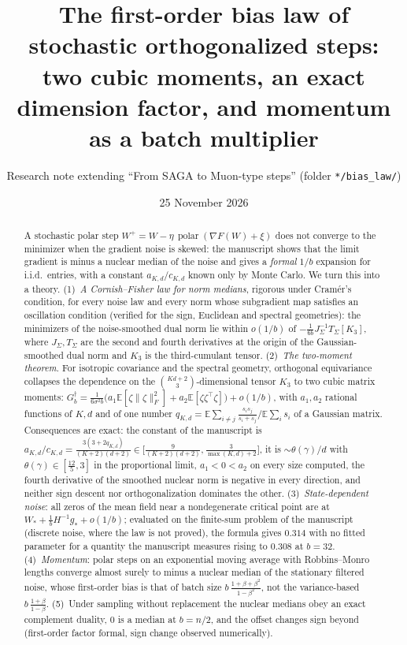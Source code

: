 \documentclass[10pt]{article}
\title{\vspace{-2em}The first-order bias law of stochastic orthogonalized steps:\\
two cubic moments, an exact dimension factor, and momentum as a batch multiplier}
\author{Research note extending ``From SAGA to Muon-type steps'' (folder \texttt{*/bias\_law/})}
\date{25 November 2026}
\theoremstyle{definition}
\theoremstyle{remark}
\newcommand{\E}{\mathbb{E}}
\newcommand{\nF}[1]{\|#1\|_{F}}
\newcommand{\polar}{\operatorname{polar}}
\newcommand{\st}{\dagger}
\begin{document}
\maketitle

\begin{abstract}
A stochastic polar step $W^+=W-\eta\,\polar(\nabla F(W)+\xi)$ does not converge to the minimizer when the gradient
noise is skewed: the manuscript shows that the limit gradient is minus a nuclear median of the noise and gives a
\emph{formal} $1/b$ expansion for i.i.d.\ entries, with a constant $a_{K,d}/c_{K,d}$ known only by Monte Carlo. We
turn this into a theory. (1)~\emph{A Cornish--Fisher law for norm medians}, rigorous under Cram\'er's condition, for
every noise law and every norm whose subgradient map satisfies an oscillation condition (verified for the sign,
Euclidean and spectral geometries): the minimizers of the noise-smoothed dual norm lie within $o(1/b)$ of
$-\frac1{6b}J_\Sigma^{-1}T_\Sigma[K_3]$, where $J_\Sigma,T_\Sigma$ are the second and fourth derivatives at the origin
of the Gaussian-smoothed dual norm and $K_3$ is the third-cumulant tensor. (2)~\emph{The two-moment theorem.} For
isotropic covariance and the spectral geometry, orthogonal equivariance collapses the dependence on the
$\binom{Kd+2}3$-dimensional tensor $K_3$ to two cubic matrix moments:
$G^\st_b=\frac1{6\sigma^2b}\big(a_1\E[\zeta\nF\zeta^2]+a_2\E[\zeta\zeta^\top\zeta]\big)+o(1/b)$, with $a_1,a_2$
rational functions of $K,d$ and of one number $q_{K,d}=\E\sum_{i\ne j}\frac{s_is_j}{s_i+s_j}/\E\sum_is_i$ of a Gaussian
matrix. Consequences are exact: the constant of the manuscript is
$a_{K,d}/c_{K,d}=\frac{3(3+2q_{K,d})}{(K+2)(d+2)}\in\big[\frac{9}{(K+2)(d+2)},\frac3{\max(K,d)+2}\big]$, it is
$\sim\theta(\gamma)/d$ with $\theta(\gamma)\in[\frac{12}5,3]$ in the proportional limit, $a_1<0<a_2$ on every size
computed, the fourth derivative of the smoothed nuclear norm is negative in every direction, and neither sign descent
nor orthogonalization dominates the other. (3)~\emph{State-dependent noise}: all zeros of the mean field near a
nondegenerate critical point are at $W_\ast+\frac1bH^{-1}g_\ast+o(1/b)$; evaluated on the finite-sum
problem of the manuscript (discrete noise, where the law is not proved), the formula gives $0.314$ with no fitted
parameter for a quantity the manuscript measures rising to $0.308$ at $b=32$. (4)~\emph{Momentum}: polar steps on an
exponential moving average with Robbins--Monro lengths converge almost surely to minus a nuclear median of the
stationary filtered noise, whose first-order bias is that of batch size $b\,\frac{1+\beta+\beta^2}{1-\beta^2}$, not the
variance-based $b\,\frac{1+\beta}{1-\beta}$. (5)~Under sampling without replacement the nuclear medians obey an exact
complement duality, $0$ is a median at $b=n/2$, and the offset changes sign beyond (first-order factor formal, sign
change observed numerically).
\end{abstract}
\end{document}
